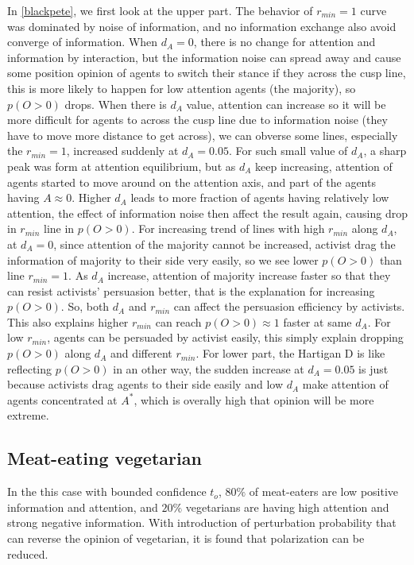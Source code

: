 \documentclass{article}
\begin{document}
In \autoref{blackpete}, we first look at the upper part. The behavior of $r_{min}=1$ curve was dominated by noise of information, and no information exchange also avoid converge of information. When $d_A=0$, there is no change for attention and information by interaction, but the information noise can spread away
and cause some position opinion of agents to switch their stance if they across the cusp line, this is more likely to happen for low attention agents (the majority), so $p(O>0)$ drops. When there is $d_A$ value, attention can increase so it will be more difficult
for agents to across the cusp line due to information noise (they have to move more distance to get across), we can obverse some lines, especially the $r_{min}=1$, increased suddenly at $d_A=0.05$. For such small value of $d_A$, a sharp peak was form at attention equilibrium, but as $d_A$ keep increasing,
attention of agents started to move around on the attention axis, and part of the agents having $A\approx0$. Higher $d_A$ leads to more fraction of agents having relatively low attention, the effect of information noise then affect the result again, causing drop in $r_{min}$ line in $p(O>0)$. For increasing trend of lines with high $r_{min}$ along $d_A$, at $d_A=0$,
since attention of the majority cannot be increased, activist drag the information of majority to their side very easily, so we see lower $p(O>0)$ than line $r_{min}=1$. As $d_A$ increase, attention of majority increase faster so that they can resist activists' persuasion better, that is the explanation for increasing $p(O>0)$. So, both $d_A$ and $r_{min}$ can affect
the persuasion efficiency by activists. This also explains higher $r_{min}$ can reach $p(O>0)\approx1$ faster at same $d_A$. For low $r_{min}$, agents can be persuaded by activist easily, this simply explain dropping $p(O>0)$ along $d_A$ and different $r_{min}$. For lower part, the Hartigan D is like reflecting $p(O>0)$ in an other way, the sudden increase at $d_A=0.05$ is just because activists drag agents to their side easily and low $d_A$
make attention of agents concentrated at $A^*$, which is overally high that opinion will be more extreme.

\subsection{Meat-eating vegetarian}
In the this case with bounded confidence $t_o$, $80\%$ of meat-eaters are low positive information and attention, and $20\%$ vegetarians are having high attention and strong negative information. With introduction of perturbation probability that can reverse the opinion of vegetarian, it is found that polarization can be reduced.
\end{document}
